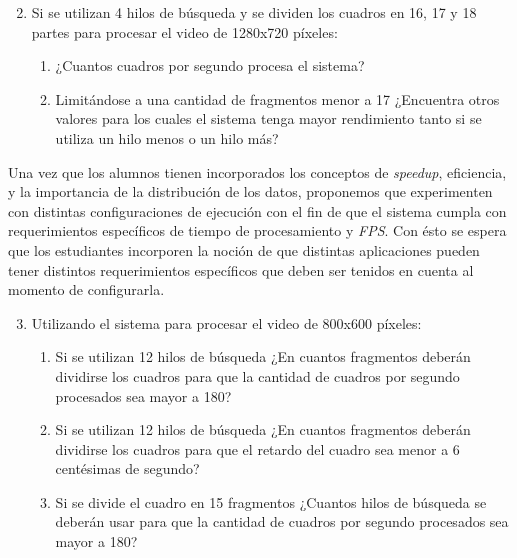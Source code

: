\begin{enumerate}
	
	\setcounter{enumi}{1}

	\item{Si se utilizan 4 hilos de búsqueda y se dividen los cuadros en 16,
		17 y 18 partes para procesar el video de 1280x720 píxeles:

\begin{enumerate}

	\item{¿Cuantos cuadros por segundo procesa el sistema?}

	\item{Limitándose a una cantidad de fragmentos menor a 17 ¿Encuentra
		otros valores para los cuales el sistema tenga mayor rendimiento
		tanto si se utiliza un hilo menos o un hilo más?}

\end{enumerate}}


\end{enumerate}

Una vez que los alumnos tienen incorporados los conceptos de \emph{speedup},
eficiencia, y la importancia de la distribución de los datos, proponemos que
experimenten con distintas configuraciones de ejecución con el fin de que el
sistema cumpla con requerimientos específicos de tiempo de procesamiento y
\emph{FPS}. Con ésto se espera que los estudiantes incorporen la noción de que
distintas aplicaciones pueden tener distintos requerimientos específicos que
deben ser tenidos en cuenta al momento de configurarla.

\begin{enumerate}

	\setcounter{enumi}{2}

	\item{Utilizando el sistema para procesar el video de 800x600 píxeles:

\begin{enumerate}

	\item{Si se utilizan 12 hilos de búsqueda ¿En cuantos fragmentos deberán
		dividirse los cuadros para que la cantidad de cuadros por
		segundo procesados sea mayor a 180?}

	\item{Si se utilizan 12 hilos de búsqueda ¿En cuantos fragmentos deberán
		dividirse los cuadros para que el retardo del cuadro sea menor a
		6 centésimas de segundo?}

	\item{Si se divide el cuadro en 15 fragmentos ¿Cuantos hilos de búsqueda
		se deberán usar para que la cantidad de cuadros por segundo
		procesados sea mayor a 180?}

\end{enumerate}}

\end{enumerate}

